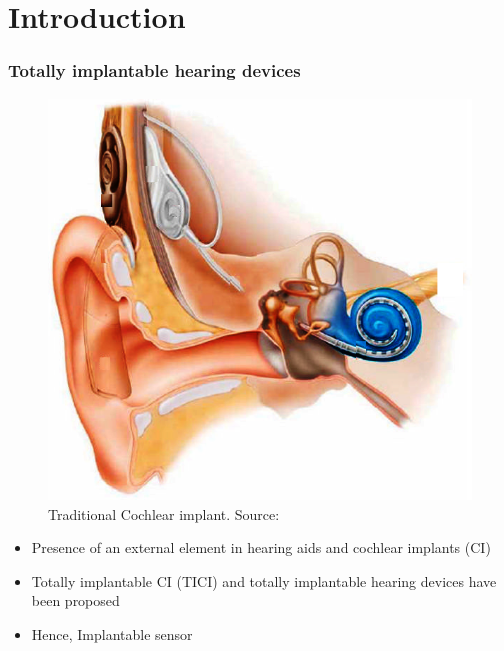 \documentclass[dvipsnames,12pt]{beamer}
\begin{document}
\section{Introduction}
\begin{frame}
\frametitle{Totally implantable hearing devices}
\begin{minipage}[t][][t]{0.4\textwidth}
\begin{figure}
  \centering
\includegraphics [width=\linewidth]{Figures/ICtrad}
\caption{Traditional Cochlear implant. Source: \cite{zeng2008}}
\end{figure}
\end{minipage}
\hfill
\begin{minipage}[t]{0.55\textwidth}
\begin{itemize}
    \item \justifying Presence of an external element in hearing aids and cochlear implants (CI)
    \item Totally implantable CI (TICI) and totally implantable hearing devices have been proposed ~\cite{briggs2008}
    \item Hence, Implantable sensor
\end{itemize}
\end{minipage}
\end{frame}
\end{document}
